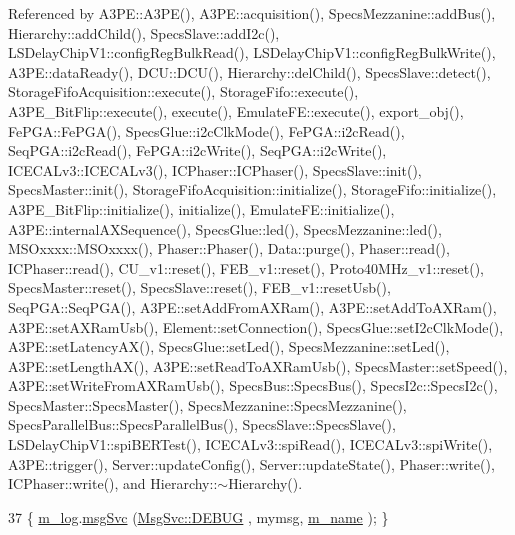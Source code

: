 Referenced by A3\+P\+E\+::\+A3\+P\+E(), A3\+P\+E\+::acquisition(), Specs\+Mezzanine\+::add\+Bus(), Hierarchy\+::add\+Child(), Specs\+Slave\+::add\+I2c(), L\+S\+Delay\+Chip\+V1\+::config\+Reg\+Bulk\+Read(), L\+S\+Delay\+Chip\+V1\+::config\+Reg\+Bulk\+Write(), A3\+P\+E\+::data\+Ready(), D\+C\+U\+::\+D\+C\+U(), Hierarchy\+::del\+Child(), Specs\+Slave\+::detect(), Storage\+Fifo\+Acquisition\+::execute(), Storage\+Fifo\+::execute(), A3\+P\+E\+\_\+\+Bit\+Flip\+::execute(), execute(), Emulate\+F\+E\+::execute(), export\+\_\+obj(), Fe\+P\+G\+A\+::\+Fe\+P\+G\+A(), Specs\+Glue\+::i2c\+Clk\+Mode(), Fe\+P\+G\+A\+::i2c\+Read(), Seq\+P\+G\+A\+::i2c\+Read(), Fe\+P\+G\+A\+::i2c\+Write(), Seq\+P\+G\+A\+::i2c\+Write(), I\+C\+E\+C\+A\+Lv3\+::\+I\+C\+E\+C\+A\+Lv3(), I\+C\+Phaser\+::\+I\+C\+Phaser(), Specs\+Slave\+::init(), Specs\+Master\+::init(), Storage\+Fifo\+Acquisition\+::initialize(), Storage\+Fifo\+::initialize(), A3\+P\+E\+\_\+\+Bit\+Flip\+::initialize(), initialize(), Emulate\+F\+E\+::initialize(), A3\+P\+E\+::internal\+A\+X\+Sequence(), Specs\+Glue\+::led(), Specs\+Mezzanine\+::led(), M\+S\+Oxxxx\+::\+M\+S\+Oxxxx(), Phaser\+::\+Phaser(), Data\+::purge(), Phaser\+::read(), I\+C\+Phaser\+::read(), C\+U\+\_\+v1\+::reset(), F\+E\+B\+\_\+v1\+::reset(), Proto40\+M\+Hz\+\_\+v1\+::reset(), Specs\+Master\+::reset(), Specs\+Slave\+::reset(), F\+E\+B\+\_\+v1\+::reset\+Usb(), Seq\+P\+G\+A\+::\+Seq\+P\+G\+A(), A3\+P\+E\+::set\+Add\+From\+A\+X\+Ram(), A3\+P\+E\+::set\+Add\+To\+A\+X\+Ram(), A3\+P\+E\+::set\+A\+X\+Ram\+Usb(), Element\+::set\+Connection(), Specs\+Glue\+::set\+I2c\+Clk\+Mode(), A3\+P\+E\+::set\+Latency\+A\+X(), Specs\+Glue\+::set\+Led(), Specs\+Mezzanine\+::set\+Led(), A3\+P\+E\+::set\+Length\+A\+X(), A3\+P\+E\+::set\+Read\+To\+A\+X\+Ram\+Usb(), Specs\+Master\+::set\+Speed(), A3\+P\+E\+::set\+Write\+From\+A\+X\+Ram\+Usb(), Specs\+Bus\+::\+Specs\+Bus(), Specs\+I2c\+::\+Specs\+I2c(), Specs\+Master\+::\+Specs\+Master(), Specs\+Mezzanine\+::\+Specs\+Mezzanine(), Specs\+Parallel\+Bus\+::\+Specs\+Parallel\+Bus(), Specs\+Slave\+::\+Specs\+Slave(), L\+S\+Delay\+Chip\+V1\+::spi\+B\+E\+R\+Test(), I\+C\+E\+C\+A\+Lv3\+::spi\+Read(), I\+C\+E\+C\+A\+Lv3\+::spi\+Write(), A3\+P\+E\+::trigger(), Server\+::update\+Config(), Server\+::update\+State(), Phaser\+::write(), I\+C\+Phaser\+::write(), and Hierarchy\+::$\sim$\+Hierarchy().


\begin{DoxyCode}
37 \{ \hyperlink{classObject_a0d269813dd7ac1f24bc143031e2963f2}{m\_log}.\hyperlink{classMsgSvc_ad25f18047920cc59a314e5098259711c}{msgSvc} (\hyperlink{classMsgSvc_ae671eb7301996cd049d2da8a65925926a1dbdcc82dce88370ec335883c83b38b0}{MsgSvc::DEBUG}   , mymsg, \hyperlink{classObject_a8b83c95c705d2c3ba0d081fe1710f48d}{m\_name} ); \}
\end{DoxyCode}
\mbox{\label{classObject_a6c9a0397ca804e04d675ed05683f5420}} 
